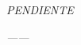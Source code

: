 \thispagestyle{empty}

\bigskip

\begin{flushright}

\vspace*{7cm}

	\textit{PENDIENTE}
	
	\textit{------}

\vspace*{\fill}

\end{flushright}

\newpage
\thispagestyle{empty}
\cleardoublepage